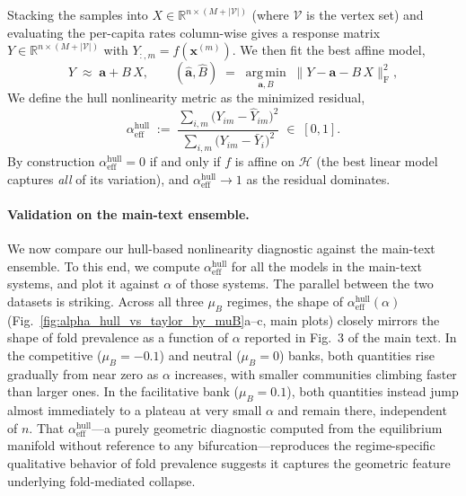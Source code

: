 \documentclass[pdflatex,sn-mathphys-num]{sn-jnl}%
\begin{document}
Stacking the samples into $X \in \mathbb{R}^{n \times (M + |\mathcal{V}|)}$ (where $\mathcal{V}$ is the vertex set) and evaluating the per-capita rates column-wise gives a response matrix $Y \in \mathbb{R}^{n \times (M + |\mathcal{V}|)}$ with $Y_{:,m} = f(\mathbf{x}^{(m)})$. We then fit the best affine model,
\begin{equation}\label{eq:affine_fit}
  Y \;\approx\; \mathbf{a} + B\,X, \qquad
  (\hat{\mathbf{a}}, \hat{B}) \;=\; \operatorname*{arg\,min}_{\mathbf{a}, B} \;\bigl\| Y - \mathbf{a} - B\,X \bigr\|_\mathrm{F}^2,
\end{equation}
We define the hull nonlinearity metric as the minimized residual,
\begin{equation}\label{eq:alpha_hull_def}
  \alpha^{\mathrm{hull}}_{\mathrm{eff}} \;:=\;\frac{\sum_{i,m}\bigl(Y_{im} - \hat{Y}_{im}\bigr)^2}{\sum_{i,m}\bigl(Y_{im} - \bar{Y}_{i}\bigr)^2} \;\in\; [0, 1].
\end{equation}
By construction $\alpha^{\mathrm{hull}}_{\mathrm{eff}} = 0$ if and only if $f$ is affine on $\mathcal{H}$ (the best linear model captures \emph{all} of its variation), and $\alpha^{\mathrm{hull}}_{\mathrm{eff}} \to 1$ as the residual dominates.

\paragraph{Validation on the main-text ensemble.}
We now compare our hull-based nonlinearity diagnostic against the main-text ensemble. To this end, we compute $\alpha^{\mathrm{hull}}_{\mathrm{eff}}$ for all the models in the main-text systems, and plot it against $\alpha$ of those systems. The parallel between the two datasets is striking. Across all three $\mu_B$ regimes, the shape of $\alpha^{\mathrm{hull}}_{\mathrm{eff}}(\alpha)$ (Fig.~\ref{fig:alpha_hull_vs_taylor_by_muB}a--c, main plots) closely mirrors the shape of fold prevalence as a function of $\alpha$ reported in Fig.~3 of the main text. In the competitive ($\mu_B = -0.1$) and neutral ($\mu_B = 0$) banks, both quantities rise gradually from near zero as $\alpha$ increases, with smaller communities climbing faster than larger ones. In the facilitative bank ($\mu_B = 0.1$), both quantities instead jump almost immediately to a plateau at very small $\alpha$ and remain there, independent of $n$. That $\alpha^{\mathrm{hull}}_{\mathrm{eff}}$---a purely geometric diagnostic computed from the equilibrium manifold without reference to any bifurcation---reproduces the regime-specific qualitative behavior of fold prevalence suggests it captures the geometric feature underlying fold-mediated collapse.
\end{document}

